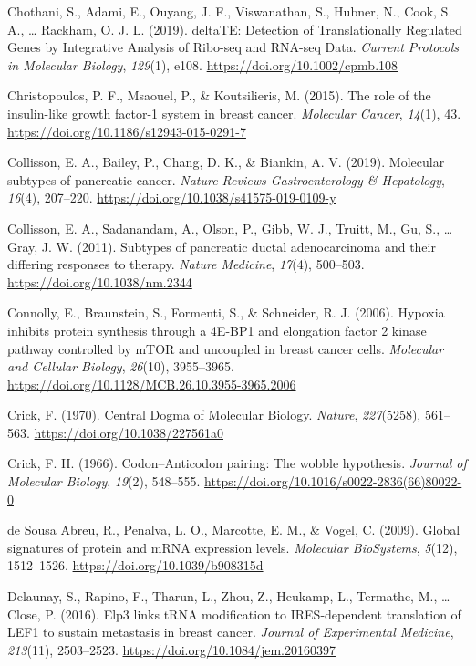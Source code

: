 \documentclass[12pt,openany]{book}
\begin{document}
\hypertarget{ref-Chothani2019}{}
Chothani, S., Adami, E., Ouyang, J. F., Viswanathan, S., Hubner, N.,
Cook, S. A., \ldots{} Rackham, O. J. L. (2019). deltaTE: Detection of
Translationally Regulated Genes by Integrative Analysis of Ribo-seq and
RNA-seq Data. \emph{Current Protocols in Molecular Biology},
\emph{129}(1), e108. \url{https://doi.org/10.1002/cpmb.108}

\hypertarget{ref-Christopoulos2015}{}
Christopoulos, P. F., Msaouel, P., \& Koutsilieris, M. (2015). The role
of the insulin-like growth factor-1 system in breast cancer.
\emph{Molecular Cancer}, \emph{14}(1), 43.
\url{https://doi.org/10.1186/s12943-015-0291-7}

\hypertarget{ref-Collisson2019}{}
Collisson, E. A., Bailey, P., Chang, D. K., \& Biankin, A. V. (2019).
Molecular subtypes of pancreatic cancer. \emph{Nature Reviews
Gastroenterology \& Hepatology}, \emph{16}(4), 207--220.
\url{https://doi.org/10.1038/s41575-019-0109-y}

\hypertarget{ref-Collisson2011}{}
Collisson, E. A., Sadanandam, A., Olson, P., Gibb, W. J., Truitt, M.,
Gu, S., \ldots{} Gray, J. W. (2011). Subtypes of pancreatic ductal
adenocarcinoma and their differing responses to therapy. \emph{Nature
Medicine}, \emph{17}(4), 500--503. \url{https://doi.org/10.1038/nm.2344}

\hypertarget{ref-Connolly2006}{}
Connolly, E., Braunstein, S., Formenti, S., \& Schneider, R. J. (2006).
Hypoxia inhibits protein synthesis through a 4E-BP1 and elongation
factor 2 kinase pathway controlled by mTOR and uncoupled in breast
cancer cells. \emph{Molecular and Cellular Biology}, \emph{26}(10),
3955--3965. \url{https://doi.org/10.1128/MCB.26.10.3955-3965.2006}

\hypertarget{ref-Crick1970}{}
Crick, F. (1970). Central Dogma of Molecular Biology. \emph{Nature},
\emph{227}(5258), 561--563. \url{https://doi.org/10.1038/227561a0}

\hypertarget{ref-Crick1966}{}
Crick, F. H. (1966). Codon--Anticodon pairing: The wobble hypothesis.
\emph{Journal of Molecular Biology}, \emph{19}(2), 548--555.
\url{https://doi.org/10.1016/s0022-2836(66)80022-0}

\hypertarget{ref-deSousaAbreu2009}{}
de Sousa Abreu, R., Penalva, L. O., Marcotte, E. M., \& Vogel, C.
(2009). Global signatures of protein and mRNA expression levels.
\emph{Molecular BioSystems}, \emph{5}(12), 1512--1526.
\url{https://doi.org/10.1039/b908315d}

\hypertarget{ref-Delaunay2016}{}
Delaunay, S., Rapino, F., Tharun, L., Zhou, Z., Heukamp, L., Termathe,
M., \ldots{} Close, P. (2016). Elp3 links tRNA modification to
IRES-dependent translation of LEF1 to sustain metastasis in breast
cancer. \emph{Journal of Experimental Medicine}, \emph{213}(11),
2503--2523. \url{https://doi.org/10.1084/jem.20160397}
\end{document}
